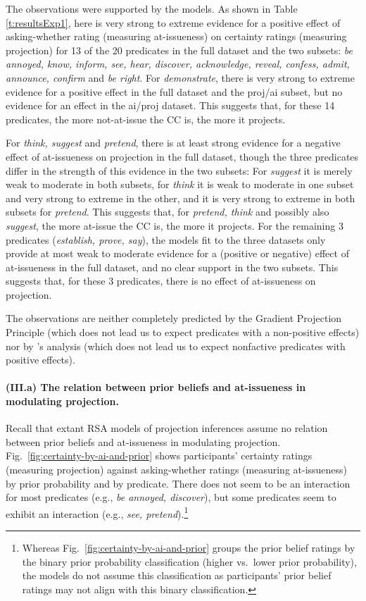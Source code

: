 \documentclass[11pt,fleqn]{article}
\newcommand{\6}{\mbox{$[\hspace*{-.6mm}[$}}
\newcommand{\9}{\mbox{$]\hspace*{-.6mm}]$}}
\newcommand{\citepos}[1]{\citeauthor{#1}'s \citeyear{#1}}
\begin{document}
The observations were supported by the models. As shown in Table \ref{t:resultsExp1}, here is very strong to extreme evidence for a positive effect of asking-whether rating (measuring at-issueness) on certainty ratings (measuring projection) for 13 of the 20 predicates in the full dataset and the two subsets: {\em be annoyed, know, inform, see, hear, discover, acknowledge, reveal, confess, admit, announce, confirm} and {\em be right}. For {\em demonstrate}, there is very strong to extreme evidence for a positive effect in the full dataset and the proj/ai subset, but no evidence for an effect in the ai/proj dataset. This suggests that, for these 14 predicates, the more not-at-issue the CC is, the more it projects. 

For {\em think, suggest} and {\em pretend}, there is at least strong evidence for a negative effect of at-issueness on projection in the full dataset, though the three predicates differ in the strength of this evidence in the two subsets: For {\em suggest} it is merely weak to moderate in both subsets, for {\em think} it is weak to moderate in one subset and very strong to extreme in the other, and it is very strong to extreme in both subsets for {\em pretend}. This suggests that, for {\em pretend, think} and possibly also {\em suggest}, the more at-issue the CC is, the more it projects. For the remaining 3 predicates ({\em establish, prove, say}), the models fit to the three datasets only provide at most weak to moderate evidence for a (positive or negative) effect of at-issueness in the full dataset, and no clear support in the two subsets. This suggests that, for these 3 predicates, there is no effect of at-issueness on projection.

The observations are neither completely predicted by the Gradient Projection Principle (which does not lead us to expect predicates with a non-positive effects) nor by \citepos{djaerv-bacovcin2020} analysis (which does not lead us to expect nonfactive predicates with positive effects).

\paragraph{(III.a) The relation between prior beliefs and at-issueness in modulating projection.} Recall that extant RSA models of projection inferences assume no relation between prior beliefs and at-issueness in modulating projection. Fig.~\ref{fig:certainty-by-ai-and-prior} shows participants' certainty ratings (measuring projection) against asking-whether ratings (measuring at-issueness) by prior probability and by predicate. There does not seem to be an interaction for most predicates (e.g., {\em be annoyed, discover}), but some predicates seem to exhibit an interaction (e.g., {\em see, pretend}).\footnote{Whereas Fig.~\ref{fig:certainty-by-ai-and-prior} groups the prior belief ratings by the binary prior probability classification (higher vs.\ lower prior probability), the models  do not assume this classification as participants' prior belief ratings may not align with this binary classification.}
\end{document}
